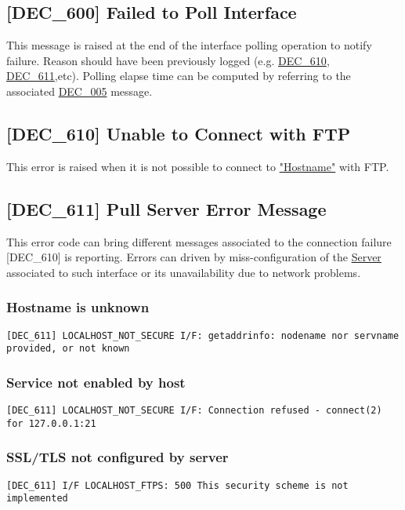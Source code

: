 \documentclass[dec_sum_main.tex]{subfiles}
\begin{document}
\subsection{[DEC\_600] Failed to Poll Interface}
\label{DEC600}
This message is raised at the end of the interface polling operation to notify failure. Reason should have been previously logged (e.g. \hyperref[DEC610]{DEC\_610}, \hyperref[DEC611]{DEC\_611},etc). Polling elapse time can be computed by referring to the associated \hyperref[DEC005]{DEC\_005} message. 

\subsection{[DEC\_610] Unable to Connect with FTP}
\label{DEC610}
This error is raised when it is not possible to connect to \hyperref[Config_Server]{"Hostname"} with FTP.

\subsection{[DEC\_611] Pull Server Error Message}
\label{DEC611}
This error code can bring different messages associated to the connection failure [DEC\_610] is reporting. Errors can driven by miss-configuration of the \hyperref[Config_Server]{Server} associated to such interface or its unavailability due to network problems.

\subsubsection{Hostname is unknown}
\begin{verbatim}
[DEC_611] LOCALHOST_NOT_SECURE I/F: getaddrinfo: nodename nor servname provided, or not known
\end{verbatim}

\subsubsection{Service not enabled by host}
\begin{verbatim}
[DEC_611] LOCALHOST_NOT_SECURE I/F: Connection refused - connect(2) for 127.0.0.1:21
\end{verbatim}

\subsubsection{SSL/TLS not configured by server}
\begin{verbatim}
[DEC_611] I/F LOCALHOST_FTPS: 500 This security scheme is not implemented
\end{verbatim}
\end{document}
